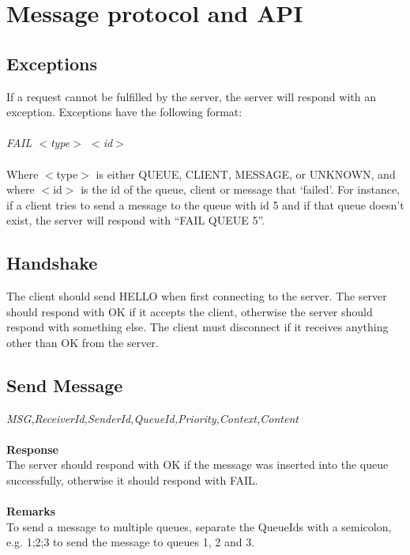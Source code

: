 \documentclass{article}
\begin{document}
        \section{Message protocol and API}
        \label{sec:message_protocol_api}
            \subsection{Exceptions}
                If a request cannot be fulfilled by the server, the server will respond with an exception.  Exceptions have the following format:\\
                \\
                \indent\textit{FAIL $<$type$>$ $<$id$>$}\\
                \\
                Where $<$type$>$ is either QUEUE, CLIENT, MESSAGE, or UNKNOWN, and where $<$id$>$ is the id of the queue, client or message that ‘failed’. For instance, if a client tries to send a message to the queue with id 5 and if that queue doesn’t exist, the server will respond with “FAIL QUEUE 5”.

            \subsection{Handshake}
                The client should send HELLO when first connecting to the server. The server should respond with OK if it accepts the client, otherwise the server should respond with something else. The client must disconnect if it receives anything other than OK from the server.


            \subsection{Send Message}
                \indent\indent\textit{MSG,ReceiverId,SenderId,QueueId,Priority,Context,Content}\\
                \\
                \textbf{Response}\\
                The server should respond with OK if the message was inserted into the queue successfully, otherwise it should respond with FAIL.\\
                \\
                \textbf{Remarks}\\
                To send a message to multiple queues, separate the QueueIds with a semicolon, e.g. 1;2;3 to send the message to queues 1, 2 and 3.
\end{document}
